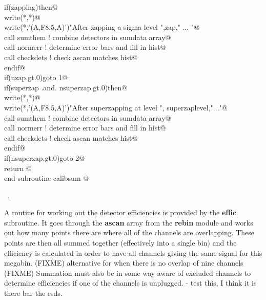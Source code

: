 \documentclass[10pt,a4paper,notitlepage]{article}
\newcommand{\var}[1]{\textbf{\textsf{#1}}} %
\newcommand{\code}[1]{\textbf{\textsf{#1}}} %
\newcommand{\mod}[1]{\textbf{\textsf{#1}}} %
\begin{document}
\begin{flushleft}
\begin{minipage}{\linewidth}
\begin{list}{}{}
\mbox{}     if(zapping)then@\\
\mbox{}\verb@       write(*,*)@\\
\mbox{}\verb@       write(*,'(A,F8.5,A)')"After zapping a sigma level ",zap," ... "@\\
\mbox{}\verb@       call sumthem      ! combine detectors in sumdata array@\\
\mbox{}\verb@       call normerr      ! determine error bars and fill in hist@\\
\mbox{}\verb@       call checkdets    ! check ascan matches hist@\\
\mbox{}\verb@      endif@\\
\mbox{}\verb@      if(nzap.gt.0)goto 1@\\
\mbox{}     if(superzap .and. nsuperzap.gt.0)then@\\
\mbox{}\verb@       write(*,*)@\\
\mbox{}\verb@       write(*,'(A,F8.5,A)')"After superzapping at level ", superzaplevel,"..."@\\
\mbox{}\verb@       call sumthem      ! combine detectors in sumdata array@\\
\mbox{}\verb@       call normerr      ! determine error bars and fill in hist@\\
\mbox{}\verb@       call checkdets    ! check ascan matches hist@\\
\mbox{}\verb@      endif@\\
\mbox{}\verb@      if(nsuperzap.gt.0)goto 2@\\
\mbox{}\verb@      return @\\
\mbox{}\verb@      end subroutine calibsum                                                @{\NWsep}
\end{list}
\vspace{-1.5ex}
\footnotesize
\begin{list}{}{\setlength{\itemsep}{-\parsep}\setlength{\itemindent}{-\leftmargin}}
\item \NWtxtMacroRefIn\ .

\item{}
\end{list}
\end{minipage}\vspace{4ex}
\end{flushleft}
A routine for working out the detector efficiencies is provided by the 
\code{effic} subroutine. It goes through the \var{ascan} array
from the \mod{rebin} module and works out how many points there
are where all of the channels are overlapping.
These points are then all summed together (effectively into a single bin)
and the efficiency is calculated in order to have all channels giving
the same signal for this megabin.
(FIXME) alternative for when there is no overlap of nine channels
(FIXME) Summation must also be in some way aware of excluded channels
to determine efficiencies if one of the channels is unplugged. - test this,
I think it is there bar the esds.
\end{document}
